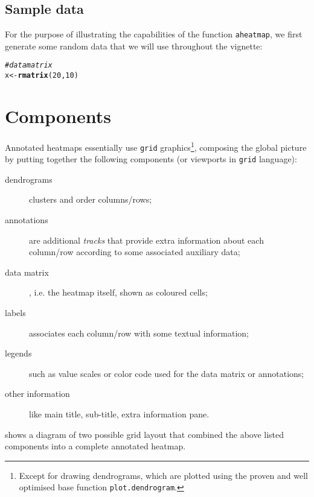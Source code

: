 \documentclass[a4paper]{article}\usepackage[]{graphicx}\usepackage[]{color}
\makeatletter
\newcommand{\hlnum}[1]{\textcolor[rgb]{0.686,0.059,0.569}{#1}}%
\newcommand{\hlcom}[1]{\textcolor[rgb]{0.678,0.584,0.686}{\textit{#1}}}%
\newcommand{\hlstd}[1]{\textcolor[rgb]{0.345,0.345,0.345}{#1}}%
\newcommand{\hlkwb}[1]{\textcolor[rgb]{0.69,0.353,0.396}{#1}}%
\newcommand{\hlkwd}[1]{\textcolor[rgb]{0.737,0.353,0.396}{\textbf{#1}}}%
\newenvironment{kframe}{%
 \def\at@end@of@kframe{}%
 \ifinner\ifhmode%
  \def\at@end@of@kframe{\end{minipage}}%
  \begin{minipage}{\columnwidth}%
 \fi\fi%
 \def\FrameCommand##1{\hskip\@totalleftmargin \hskip-\fboxsep
 \colorbox{shadecolor}{##1}\hskip-\fboxsep
     \hskip-\linewidth \hskip-\@totalleftmargin \hskip\columnwidth}%
 \MakeFramed {\advance\hsize-\width
   \@totalleftmargin\z@ \linewidth\hsize
   \@setminipage}}%
 {\par\unskip\endMakeFramed%
 \at@end@of@kframe}
\newenvironment{knitrout}{}{} %
\let\code=\texttt
\makeatother
\begin{document}
\subsection{Sample data}
For the purpose of illustrating the capabilities of the function
\code{aheatmap}, we first generate some random data that we will use throughout
the vignette:

\begin{knitrout}\small
{}\color{fgcolor}\begin{kframe}
\begin{alltt}
\hlcom{# data matrix}
\hlstd{x} \hlkwb{<-} \hlkwd{rmatrix}\hlstd{(}\hlnum{20}\hlstd{,} \hlnum{10}\hlstd{)}
\end{alltt}
\end{kframe}
\end{knitrout}


\section{Components}

Annotated heatmaps essentially use \code{grid} graphics\footnote{Except for
drawing dendrograms, which are plotted using the proven and well optimised base
function \code{plot.dendrogram}.}, composing the global picture by putting
together the following components (or viewports in \code{grid} language):

\begin{description}
  \item[dendrograms] clusters and order columns/rows; 
  \item[annotations] are additional \emph{tracks} that provide extra
  information about each column/row according to some associated auxiliary data;
  \item[data matrix], i.e. the heatmap itself, shown as coloured cells;
  \item[labels] associates each column/row with some textual information;
  \item[legends] such as value scales or color code used for the data matrix or
  annotations;
  \item[other information] like main title, sub-title, extra information pane.
\end{description}

 shows a diagram of two possible grid layout that combined
the above listed components into a complete annotated heatmap.
\end{document}
